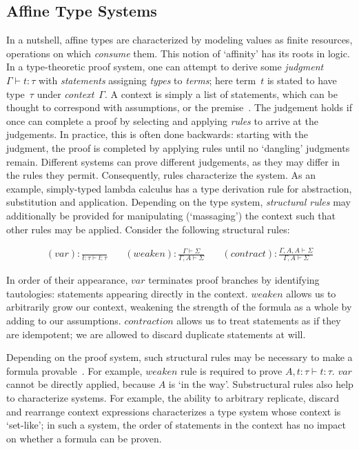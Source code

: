 \subsection{Affine Type Systems}
\label{sec:affine_type_systems}
In a nutshell, affine types are characterized by modeling values as finite resources, operations on which \textit{consume} them. This notion of `affinity' has its roots in logic. In a type-theoretic proof system, one can attempt to derive some \textit{judgment} $\Gamma\vdash{}t:\tau$ with \textit{statements} assigning \textit{types} to \textit{terms}; here term~$t$ is stated to have type~$\tau$ under \textit{context}~$\Gamma$. A context is simply a list of statements, which can be thought to correspond with assumptions, or the premise~\cite{nederpelt2014type}. The judgement holds if once can complete a proof by selecting and applying \textit{rules} to arrive at the judgements. In practice, this is often done backwards: starting with the judgment, the proof is completed by applying rules until no `dangling' judgments remain. Different systems can prove different judgements, as they may differ in the rules they permit. Consequently, rules characterize the system.
As an example, simply-typed lambda calculus has a type derivation rule for abstraction, substitution and application. Depending on the type system, \textit{structural rules} may additionally be provided for manipulating (`massaging') the context such that other rules may be applied. Consider the following structural rules:

\[
\begin{aligned}
(var): \frac{}{t:\tau \vdash t: \tau}
&\quad
(weaken): \frac{\Gamma \vdash \Sigma}{\Gamma, A \vdash \Sigma}
&\quad
(contract): \frac{\Gamma, A, A \vdash \Sigma}{\Gamma, A \vdash \Sigma}
\end{aligned}
\]

In order of their appearance, $var$ terminates proof branches by identifying tautologies: statements appearing directly in the context. $weaken$ allows us to arbitrarily grow our context, weakening the strength of the formula as a whole by adding to our assumptions. $contraction$ allows us to treat statements as if they are idempotent; we are allowed to discard duplicate statements at will. 

Depending on the proof system, such structural rules may be necessary to make a formula provable~\cite{nederpelt2014type}. For example, $weaken$ rule is required to prove $A, t:\tau\vdash t:\tau$. $var$ cannot be directly applied, because $A$ is `in the way'. Substructural rules also help to characterize systems.
For example, the ability to arbitrary replicate, discard and rearrange context expressions characterizes a type system whose context is `set-like'; in such a system, the order of statements in the context has no impact on whether a formula can be proven.

